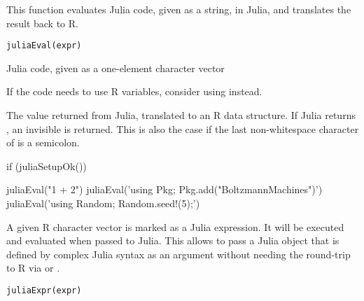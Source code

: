 %
\begin{Description}\relax
This function evaluates Julia code, given as a string, in Julia,
and translates the result back to R.
\end{Description}
%
\begin{Usage}
\begin{verbatim}
juliaEval(expr)
\end{verbatim}
\end{Usage}
%
\begin{Arguments}
\begin{ldescription}
\item[\code{expr}] Julia code, given as a one-element character vector
\end{ldescription}
\end{Arguments}
%
\begin{Details}\relax
If the code needs to use R variables, consider using 
instead.
\end{Details}
%
\begin{Value}
The value returned from Julia, translated to an R data structure.
If Julia returns , an invisible  is returned.
This is also the case if the last non-whitespace character of 
is a semicolon.
\end{Value}
%
\begin{Examples}
\begin{ExampleCode}
if (juliaSetupOk()) {

   juliaEval("1 + 2")
   juliaEval('using Pkg; Pkg.add("BoltzmannMachines")')
   juliaEval('using Random; Random.seed!(5);')

}


\end{ExampleCode}
\end{Examples}
%
\begin{Description}\relax
A given R character vector is marked as a Julia expression.
It will be executed and evaluated when passed to Julia.
This allows to pass a Julia object that is defined by complex Julia syntax
as an argument without needing the round-trip to R via 
or .
\end{Description}
%
\begin{Usage}
\begin{verbatim}
juliaExpr(expr)
\end{verbatim}
\end{Usage}
